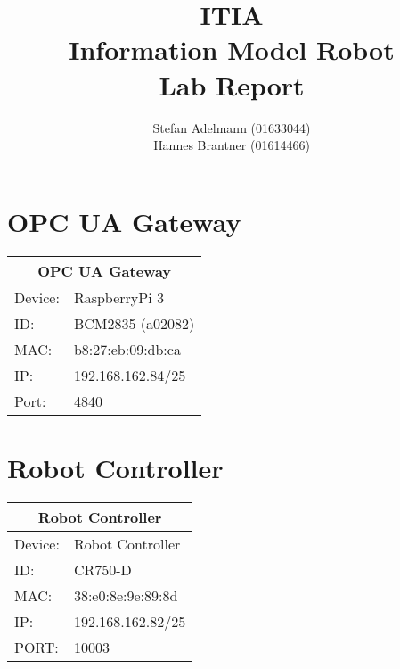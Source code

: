 \documentclass{article}
\title{ITIA\\Information Model Robot\\Lab Report}
\author{Stefan Adelmann (01633044)\\Hannes Brantner (01614466)}
\begin{document}
\maketitle{}

\section{OPC UA Gateway}
\begin{center}
	\setlength\extrarowheight{2pt}
	\begin{tabular}[h]{|p{1.2cm}p{4.5cm}|}
		\hline
		\multicolumn{2}{|c|}{\bf OPC UA Gateway}\\
		\hline\hline
		Device: & RaspberryPi 3\\
		\hline
		ID: & BCM2835 (a02082)\\
		\hline
		MAC: & b8:27:eb:09:db:ca\\
		\hline
		IP: & 192.168.162.84/25\\
		\hline
		Port: & 4840\\
		\hline
	\end{tabular} 
\end{center}

\section{Robot Controller}
\begin{center}
	\setlength\extrarowheight{2pt}
	\begin{tabular}[h]{|p{1.2cm}p{4.5cm}|}
		\hline
		\multicolumn{2}{|c|}{\bf Robot Controller}\\
		\hline\hline
		Device: & Robot Controller\\
		\hline
		ID: & CR750-D\\
		\hline
		MAC: & 38:e0:8e:9e:89:8d\\
		\hline
		IP: & 192.168.162.82/25\\
		\hline
		PORT: & 10003\\
		\hline
	\end{tabular} 
\end{center}
\end{document}
